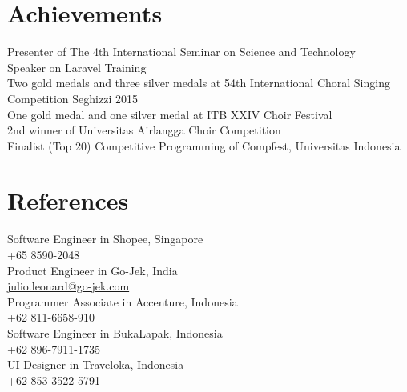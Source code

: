 \documentclass[letterpaper]{deedy-resume} %
\begin{document}
\newpage %
\begin{minipage}[t]{0.39\textwidth}


\section{Achievements}
  Presenter of The 4th International Seminar on Science and Technology \\
  Speaker on Laravel Training \\
  Two gold medals and three silver medals at 54th International Choral Singing Competition Seghizzi 2015 \\
  One gold medal and one silver medal at ITB XXIV Choir Festival \\
  2nd winner of Universitas Airlangga Choir Competition \\
  Finalist (Top 20) Competitive Programming of Compfest, Universitas Indonesia \\
\sectionspace


\section{References}
  Software Engineer in Shopee, Singapore\\
  +65 8590-2048\\
  Product Engineer in Go-Jek, India\\
  \href{mailto:julio.leonard@go-jek.com}{julio.leonard@go-jek.com}\\
  Programmer Associate in Accenture, Indonesia\\
  +62 811-6658-910\\
  Software Engineer in BukaLapak, Indonesia\\
  +62 896-7911-1735\\
  UI Designer in Traveloka, Indonesia\\
  +62 853-3522-5791\\

\end{minipage} %
\end{document}
